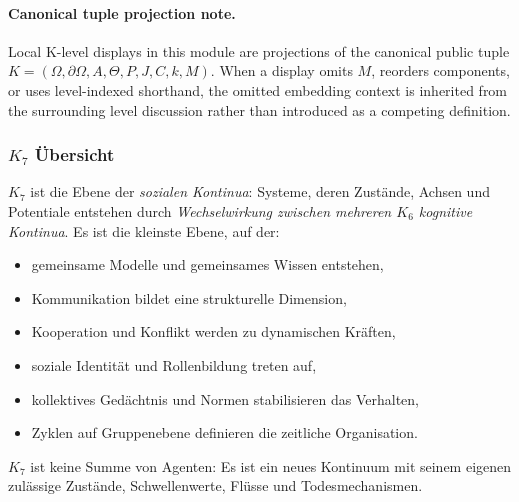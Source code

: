 



\paragraph{Canonical tuple projection note.}
Local K-level displays in this module are projections of the canonical public tuple \(K=(\Omega,\partial\Omega,A,\Theta,P,J,C,k,M)\). When a display omits \(M\), reorders components, or uses level-indexed shorthand, the omitted embedding context is inherited from the surrounding level discussion rather than introduced as a competing definition.

\subsubsection{\texorpdfstring{$K_7$}{K_7} Übersicht}
\label{sec:k7-overview}

$K_7$ ist die Ebene der \emph{sozialen Kontinua}: Systeme, deren Zustände,
Achsen und Potentiale entstehen durch \emph{Wechselwirkung zwischen mehreren $K_6$
kognitive Kontinua}. Es ist die kleinste Ebene, auf der:

\begin{itemize}
    \item gemeinsame Modelle und gemeinsames Wissen entstehen,
    \item Kommunikation bildet eine strukturelle Dimension,
    \item Kooperation und Konflikt werden zu dynamischen Kräften,
    \item soziale Identität und Rollenbildung treten auf,
    \item kollektives Gedächtnis und Normen stabilisieren das Verhalten,
    \item Zyklen auf Gruppenebene definieren die zeitliche Organisation.
\end{itemize}

$K_7$ ist keine Summe von Agenten: Es ist ein neues Kontinuum mit seinem eigenen
zulässige Zustände, Schwellenwerte, Flüsse und Todesmechanismen.

